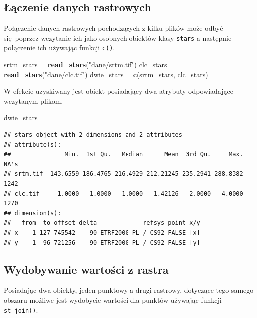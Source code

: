 \documentclass[
  paper=6in:9in,pagesize=pdftex,headinclude=on,footinclude=on,10pt]{scrbook}
\newenvironment{Shaded}{\begin{snugshade}}{\end{snugshade}}
\newcommand{\FunctionTok}[1]{\textcolor[rgb]{0.13,0.29,0.53}{\textbf{#1}}}
\newcommand{\NormalTok}[1]{#1}
\newcommand{\OtherTok}[1]{\textcolor[rgb]{0.56,0.35,0.01}{#1}}
\newcommand{\StringTok}[1]{\textcolor[rgb]{0.31,0.60,0.02}{#1}}
\begin{document}
\subsection{Łączenie danych rastrowych}\label{ux142ux105czenie-danych-rastrowych}

Połączenie danych rastrowych pochodzących z kilku plików może odbyć się~poprzez wczytanie ich jako osobnych obiektów klasy \texttt{stars} a następnie połączenie ich używając funkcji \texttt{c()}.

\begin{Shaded}
\begin{Highlighting}[]
\NormalTok{srtm\_stars }\OtherTok{=} \FunctionTok{read\_stars}\NormalTok{(}\StringTok{"dane/srtm.tif"}\NormalTok{)}
\NormalTok{clc\_stars }\OtherTok{=} \FunctionTok{read\_stars}\NormalTok{(}\StringTok{"dane/clc.tif"}\NormalTok{)}
\NormalTok{dwie\_stars }\OtherTok{=} \FunctionTok{c}\NormalTok{(srtm\_stars, clc\_stars)}
\end{Highlighting}
\end{Shaded}

W efekcie uzyskiwany jest obiekt posiadający dwa atrybuty odpowiadające wczytanym plikom.

\begin{Shaded}
\begin{Highlighting}[]
\NormalTok{dwie\_stars}
\end{Highlighting}
\end{Shaded}

\begin{verbatim}
## stars object with 2 dimensions and 2 attributes
## attribute(s):
##               Min.  1st Qu.   Median      Mean  3rd Qu.     Max. NA's
## srtm.tif  143.6559 186.4765 216.4929 212.21245 235.2941 288.8382 1242
## clc.tif     1.0000   1.0000   1.0000   1.42126   2.0000   4.0000 1270
## dimension(s):
##   from  to offset delta             refsys point x/y
## x    1 127 745542    90 ETRF2000-PL / CS92 FALSE [x]
## y    1  96 721256   -90 ETRF2000-PL / CS92 FALSE [y]
\end{verbatim}

\subsection{Wydobywanie wartości z rastra}\label{wydobywanie-wartoux15bci-z-rastra}

Posiadając dwa obiekty, jeden punktowy a drugi rastrowy, dotyczące tego samego obszaru możliwe jest wydobycie wartości dla punktów używając funkcji \texttt{st\_join()}.
\end{document}
